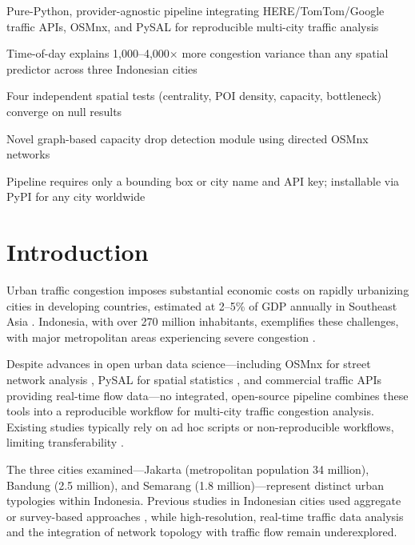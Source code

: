 \documentclass[preprint,12pt,authoryear]{elsarticle}
\begin{document}
\begin{highlights}
\item Pure-Python, provider-agnostic pipeline integrating HERE/TomTom/Google traffic APIs, OSMnx, and PySAL for reproducible multi-city traffic analysis
\item Time-of-day explains 1,000--4,000$\times$ more congestion variance than any spatial predictor across three Indonesian cities
\item Four independent spatial tests (centrality, POI density, capacity, bottleneck) converge on null results
\item Novel graph-based capacity drop detection module using directed OSMnx networks
\item Pipeline requires only a bounding box or city name and API key; installable via PyPI for any city worldwide
\end{highlights}

\section{Introduction}
\label{sec:intro}

Urban traffic congestion imposes substantial economic costs on rapidly urbanizing cities in developing countries, estimated at 2--5\% of GDP annually in Southeast Asia \citep{ADB2019}. Indonesia, with over 270 million inhabitants, exemplifies these challenges, with major metropolitan areas experiencing severe congestion \citep{TomTom2023}.

Despite advances in open urban data science---including OSMnx for street network analysis \citep{Boeing2017}, PySAL for spatial statistics \citep{Rey2010}, and commercial traffic APIs providing real-time flow data---no integrated, open-source pipeline combines these tools into a reproducible workflow for multi-city traffic congestion analysis. Existing studies typically rely on ad hoc scripts or non-reproducible workflows, limiting transferability \citep{Fleischmann2022,Boeing2022}.

The three cities examined---Jakarta (metropolitan population 34 million), Bandung (2.5 million), and Semarang (1.8 million)---represent distinct urban typologies within Indonesia. Previous studies in Indonesian cities used aggregate or survey-based approaches \citep{Susilo2007,Joewono2008}, while high-resolution, real-time traffic data analysis and the integration of network topology with traffic flow remain underexplored.
\end{document}
